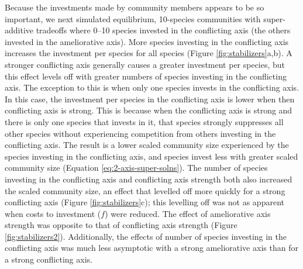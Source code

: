 Because the investments made by community members appears to be so important,
we next simulated equilibrium, 10-species communities with super-additive 
tradeoffs where 0--10 species invested in the conflicting axis
(the others invested in the ameliorative axis).
More species investing in the conflicting axis increases the investment
per species for all species (Figure \ref{fig:stabilizers}a,b).
A stronger conflicting axis generally causes a greater investment per species,
but this effect levels off with greater numbers of species investing in 
the conflicting axis.
The exception to this is when only one species invests in the conflicting axis.
In this case, the investment per species in the conflicting axis is lower
when then conflicting axis is strong.
This is because when the conflicting axis is strong and there is only one
species that invests in it, that species strongly suppresses all other species 
without experiencing competition from others investing in the conflicting axis.
The result is a lower scaled community size experienced by the species
investing in the conflicting axis, and species invest less with greater
scaled community size (Equation \ref{eq:2-axis-super-solns}).
The number of species investing in the conflicting axis and 
conflicting axis strength both also increased the scaled community 
size, an effect that levelled off more quickly for a strong conflicting axis
(Figure \ref{fig:stabilizers}c);
this levelling off was not as apparent when costs to investment ($f$) were reduced.
The effect of ameliorative axis strength was opposite to that of conflicting axis
strength (Figure \ref{fig:stabilizers2}).
Additionally, the effects of number of species investing in the conflicting
axis was much less asymptotic with a strong ameliorative axis than for a strong
conflicting axis.

